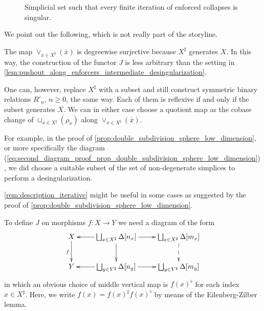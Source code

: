 \begin{figure}
\caption{Simplicial set such that every finite iteration of enforced collapses is singular.}
\label{fig:ch2_finite_number_of_enforced_collapses_not_enough}
\end{figure}

We point out the following, which is not really part of the storyline.
\begin{remark}\label{rem:description_iterative}
The map $\vee _{x\in X^\sharp }(\bar{x} )$ is degreewise surjective because $X^\sharp$ generates $X$. In this way, the construction of the functor $J$ is less arbitrary than the setting in \cref{lem:pushout_along_enforcers_intermediate_desingularization}.

One can, however, replace $X^\sharp$ with a subset and still construct symmetric binary relations $R'_n$, $n\geq 0$, the same way. Each of them is reflexive if and only if the subset generates $X$. We can in either case choose a quotient map as the cobase change of $\sqcup _{x\in X^\sharp }(\rho _x)$ along $\vee _{x\in X^\sharp }(\bar{x} )$.

For example, in the proof of \cref{prop:double_subdivision_sphere_low_dimension}, or more specifically the diagram (\ref{eq:second_diagram_proof_prop_double_subdivision_sphere_low_dimension}), we did choose a suitable subset of the set of non-degenerate simplices to perform a desingularization.
\end{remark}
\noindent \cref{rem:description_iterative} might be useful in some cases as suggested by the proof of \cref{prop:double_subdivision_sphere_low_dimension}.

To define $J$ on morphisms $f:X\to Y$ we need a diagram of the form
\begin{equation}
\label{eq:second_diagram_description_iterative}
\begin{gathered}
 \xymatrix{
 X \ar[d]_f & \bigsqcup _{x\in X^\sharp}\Delta [n_x] \ar[l] \ar[d] \ar[r] & \bigsqcup _{x\in X^\sharp}\Delta [m_x] \ar@{-->}[d] \\
 Y & \bigsqcup _{y\in Y^\sharp}\Delta [n_y] \ar[l] \ar[r] & \bigsqcup _{y\in Y^\sharp}\Delta [m_y]
 }
\end{gathered}
\end{equation}
in which an obvious choice of middle vertical map is $f(x)^\flat$ for each index $x\in X^\sharp$. Here, we write $f(x)=f(x)^\sharp f(x)^\flat$ by means of the Eilenberg-Zilber lemma.

